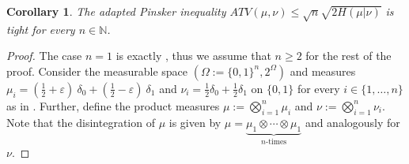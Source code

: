 \documentclass[10pt, A4paper]{amsart}
\newtheorem{corollary}[theorem]{Corollary}
\theoremstyle{definition}
\numberwithin{equation}{section}
\begin{document}
\begin{corollary}\label{cor:PinskerTight}
    The adapted Pinsker inequality $ATV(\mu,\nu) \leq \sqrt{n} \sqrt{2 H(\mu|\nu)}$ is tight for every $n \in \mathbb{N}$. %
\end{corollary}
    
\begin{proof}
    The case $n=1$ is exactly , thus we assume that $n \ge 2$ for the rest of the proof. Consider the measurable space $(\Omega:=\{0,1\}^n,2^\Omega)$ and measures $\mu_i=(\frac{1}{2}+\varepsilon)\ \delta_0 + (\frac{1}{2}-\varepsilon)\ \delta_1$ and $\nu_i = \frac{1}{2}\delta_0+\frac{1}{2}\delta_1$ on $\{0,1\}$ for every $i\in \{1,\ldots,n\}$ as in . Further, define the product measures $\mu := \bigotimes_{i=1}^n \mu_i$ and $\nu := \bigotimes_{i=1}^n \nu_i$. Note that the disintegration of $\mu$ is given by $\mu=\underbrace{\mu_1 \otimes \cdots \otimes \mu_1}_\text{$n$-times}$ 
    and analogously for $\nu$.


\end{proof}
\end{document}
